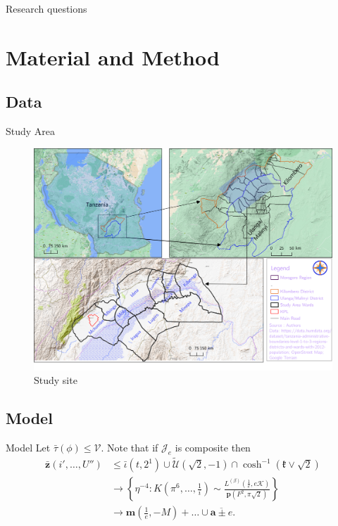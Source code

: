 \documentclass[xcolor=table]{beamer}
\begin{document}
\begin{frame}{Research questions}

\end{frame}

\section{Material and Method}
\subsection{Data}

\begin{frame}{Study Area}
    \begin{figure}
        \includegraphics[scale=0.33]{studyArea.png}
        \caption{Study site}
        \end{figure}
\end{frame}

\subsection{Model}
\begin{frame}{Model}
	Let $\bar{\tau} ( \phi ) \le \mathscr{{V}}$. Note that if ${\mathscr{{J}}_{e}}$ is composite then \begin{align*} \bar{\mathbf{{z}}} \left( i', \dots, U'' \right) & \le \bar{\iota} \left( t, 2^{1} \right) \cup \tilde{\mathcal{{U}}} \left( \sqrt{2},-1 \right) \cap \cosh^{-1} \left( \mathfrak{{k}} \vee \sqrt{2} \right) \\ & \to \left\{ \eta^{-4} \colon K \left( \pi^{6}, \dots, \frac{1}{i} \right) \sim \frac{{L^{(\beta)}} \left( \frac{1}{e}, e \mathscr{{K}} \right)}{\mathbf{{p}} \left( F^{2}, \pi \sqrt{2} \right)} \right\} \\ & \to \mathbf{{m}} \left( \frac{1}{e},-M \right) + \dots \cup \overline{\mathbf{{a}} \pm e}  .\end{align*} 
\end{frame}
\end{document}
